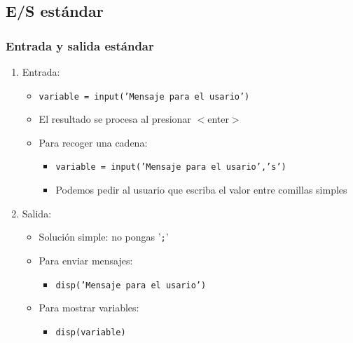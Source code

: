 \subsection{E/S estándar}
\begin{frame}[label=io_std]
 \frametitle{Entrada y salida estándar}
 \begin{enumerate}
  \item Entrada:
  \begin{itemize}
   \item \texttt{variable = input('Mensaje para el usario')}
   \item El resultado se procesa al presionar \alert{$<$enter$>$}
   \item Para recoger una cadena: 
   \begin{itemize}
    \item \texttt{variable = input('Mensaje para el usario','s')}
    \item Podemos pedir al usuario que escriba el valor entre comillas simples
   \end{itemize}
  \end{itemize}
  \item Salida:
  \begin{itemize}
   \item Solución simple: \alert{no pongas} '\alert{\texttt{;}}'
   \item Para enviar mensajes:
   \begin{itemize}
     \item \texttt{disp('Mensaje para el usario')}
   \end{itemize}
   \item Para mostrar variables:
   \begin{itemize}
     \item \texttt{disp(variable)}
   \end{itemize}
  \end{itemize}
 \end{enumerate}
\end{frame}

